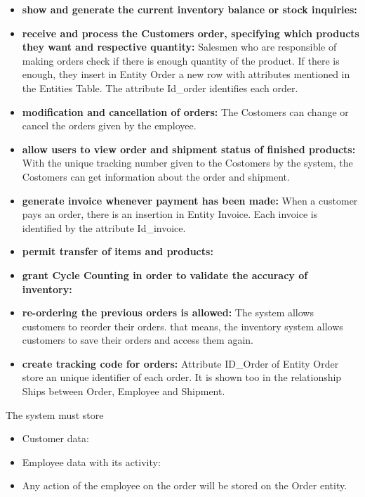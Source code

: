 \begin{itemize}
    \item \textbf{show and generate the current inventory balance or stock inquiries:}
    \item \textbf{receive and process the Customers order, specifying which products they want and respective quantity:} Salesmen who are responsible of making orders check if there is enough quantity of the product. If there is enough, they insert in Entity Order a new row with attributes mentioned in the Entities Table. The attribute Id\_order identifies each order.
    \item \textbf{modification and cancellation of orders:} The Costomers can change or cancel the orders given by the employee.
    \item \textbf{allow users to view order and shipment status of finished products:} With the unique tracking number given to the Costomers by the system, the Costomers can get information about the order and shipment.
    \item \textbf{generate invoice whenever payment has been made:} When a customer pays an order, there is an insertion in  Entity Invoice. Each invoice is identified by the attribute Id\_invoice.
    \item \textbf{permit transfer of items and products:}
    \item \textbf{grant Cycle Counting in order to validate the accuracy of inventory:}
    \item \textbf{re-ordering the previous orders is allowed:} The system allows customers to reorder their orders. that means, the inventory system allows customers to save their orders and access them again.
    \item \textbf{create tracking code for orders:} Attribute ID\_Order of Entity Order store an unique identifier of each order. It is shown too in the relationship Ships between Order, Employee and Shipment.
\end{itemize}




The system must store
\begin{itemize}
	\item Customer data:
\end{itemize}
\begin{itemize}
	\item Employee data with its activity:
	\item Any action of the employee on the order will be stored on the Order entity.
\end{itemize}

